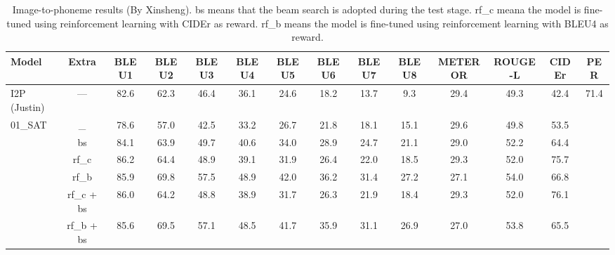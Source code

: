 \documentclass[journal,comsoc]{IEEEtran}
\begin{document}
\begin{table*}[htp]
\centering
\setlength{\tabcolsep}{1.2mm}
\caption{Image-to-phoneme results (By Xinsheng). bs means that the beam search is adopted during the test stage. rf\_c meana the model is fine-tuned using reinforcement learning with CIDEr as reward. rf\_b means the model is fine-tuned using reinforcement learning with BLEU4 as reward.}
\label{tab:image2phone}
\begin{tabular}{l|c|cccccccccccc}
\hline
Model                                     & \multicolumn{1}{c|}{Extra} & \multicolumn{1}{c}{BLEU1} & \multicolumn{1}{c}{BLEU2} & \multicolumn{1}{c}{BLEU3} & \multicolumn{1}{c}{BLEU4} & \multicolumn{1}{c}{BLEU5} & \multicolumn{1}{c}{BLEU6} & \multicolumn{1}{c}{BLEU7} & \multicolumn{1}{c}{BLEU8} & \multicolumn{1}{c}{METEROR} & \multicolumn{1}{c}{ROUGE-L} & \multicolumn{1}{c}{CIDEr} & \multicolumn{1}{c}{PER}  \\ \hline
I2P (Justin)                                      & ---                               & \multicolumn{1}{c}{82.6}  & \multicolumn{1}{c}{62.3}  & \multicolumn{1}{c}{46.4}  & \multicolumn{1}{c}{36.1}  & \multicolumn{1}{c}{24.6}  & \multicolumn{1}{c}{18.2}  & \multicolumn{1}{c}{13.7}  & \multicolumn{1}{c}{9.3}   & \multicolumn{1}{c}{29.4}    & \multicolumn{1}{c}{49.3}    & \multicolumn{1}{c}{42.4}  & \multicolumn{1}{c}{71.4} \\ \hline
\multirow{6}{*}{01\_SAT}          & \_         & 78.6    & 57.0    & 42.5    & 33.2    & 26.7    & 21.8    & 18.1    & 15.1    & 29.6   & 49.8     & 53.5  \\
                                  & bs         & 84.1    & 63.9    & 49.7    & 40.6    & 34.0    & 28.9    & 24.7    & 21.1    & 29.0   & 52.2     & 64.4  \\
                                  & rf\_c      & 86.2    & 64.4    & 48.9    & 39.1    & 31.9    & 26.4    & 22.0    & 18.5    & 29.3   & 52.0     & 75.7  \\
                                  & rf\_b      & 85.9    & 69.8    & 57.5    & 48.9    & 42.0    & 36.2    & 31.4    & 27.2    & 27.1   & 54.0     & 66.8  \\
                                  & rf\_c + bs & 86.0    & 64.2    & 48.8    & 38.9    & 31.7    & 26.3    & 21.9    & 18.4    & 29.3   & 52.0     & 76.1  \\
                                  & rf\_b + bs & 85.6    & 69.5    & 57.1    & 48.5    & 41.7    & 35.9    & 31.1    & 26.9    & 27.0   & 53.8     & 65.5  \\

\end{tabular}
\end{table*}
\end{document}
